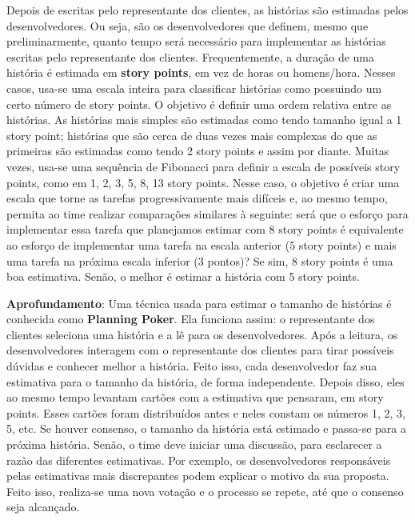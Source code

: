 \documentclass[
  11pt,
  twoside]{book}
\newenvironment{esmbox}{\centering \vspace{1.5ex} \begin{tcolorbox}[breakable, colback=backcolor, width=4.9in]}{\end{tcolorbox} \vspace{1.5ex}}
\begin{document}
Depois de escritas pelo representante dos clientes, as histórias são
estimadas pelos desenvolvedores. Ou seja, são os desenvolvedores que
definem, mesmo que preliminarmente, quanto tempo será necessário para
implementar as histórias escritas pelo representante dos clientes.
Frequentemente, a duração de uma história é estimada em \textbf{story
points},  
em vez de horas ou homens/hora. Nesses casos, usa-se uma escala inteira
para classificar histórias como possuindo um certo número de story
points. O objetivo é definir uma ordem relativa entre as histórias. As
histórias mais simples são estimadas como tendo tamanho igual a 1 story
point; histórias que são cerca de duas vezes mais complexas do que as
primeiras são estimadas como tendo 2 story points e assim por diante.
Muitas vezes, usa-se uma sequência de Fibonacci para definir a escala de
possíveis story points, como em 1, 2, 3, 5, 8, 13 story points. Nesse
caso, o objetivo é criar uma escala que torne as tarefas
progressivamente mais difíceis e, ao mesmo tempo, permita ao time
realizar comparações similares à seguinte: será que o esforço para
implementar essa tarefa que planejamos estimar com 8 story points é
equivalente ao esforço de implementar uma tarefa na escala anterior (5
story points) e mais uma tarefa na próxima escala inferior (3 pontos)?
Se sim, 8 story points é uma boa estimativa. Senão, o melhor é estimar a
história com 5 story points.

 

\begin{esmbox}

\textbf{Aprofundamento}: Uma técnica usada para estimar o tamanho de
histórias é conhecida como \textbf{Planning Poker}. Ela funciona assim:
o representante dos clientes seleciona uma história e a lê para os
desenvolvedores. Após a leitura, os desenvolvedores interagem com o
representante dos clientes para tirar possíveis dúvidas e conhecer
melhor a história. Feito isso, cada desenvolvedor faz sua estimativa
para o tamanho da história, de forma independente. Depois disso, eles ao
mesmo tempo levantam cartões com a estimativa que pensaram, em story
points. Esses cartões foram distribuídos antes e neles constam os
números 1, 2, 3, 5, etc. Se houver consenso, o tamanho da história está
estimado e passa-se para a próxima história. Senão, o time deve iniciar
uma discussão, para esclarecer a razão das diferentes estimativas. Por
exemplo, os desenvolvedores responsáveis pelas estimativas mais
discrepantes podem explicar o motivo da sua proposta. Feito isso,
realiza-se uma nova votação e o processo se repete, até que o consenso
seja alcançado.

\end{esmbox}
\end{document}
